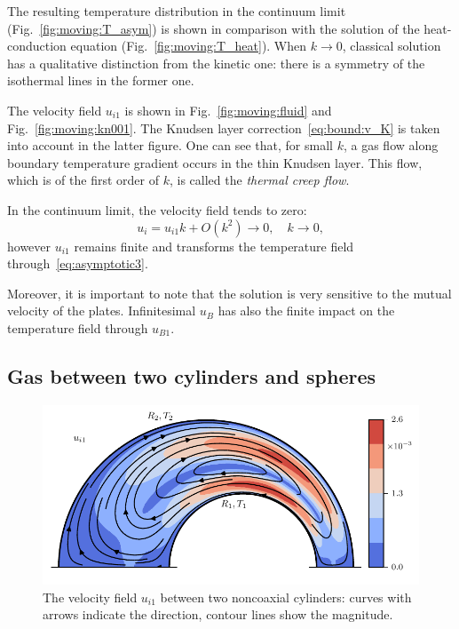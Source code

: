 \documentclass[smallextended, referee]{svjour3} %
\begin{document}
The resulting temperature distribution in the continuum limit (Fig.~\ref{fig:moving:T_asym}) is shown
in comparison with the solution of the heat-conduction equation (Fig.~\ref{fig:moving:T_heat}).
When \(k\to0\), classical solution has a qualitative distinction from the kinetic one: 
there is a symmetry of the isothermal lines in the former one.

The velocity field \(u_{i1}\) is shown in Fig.~\ref{fig:moving:fluid} and Fig.~\ref{fig:moving:kn001}.
The Knudsen layer correction~\eqref{eq:bound:v_K} is taken into account in the latter figure.
One can see that, for small \(k\), a gas flow along boundary temperature gradient occurs
in the thin Knudsen layer. This flow, which is of the first order of \(k\), is called
the \textit{thermal creep flow}.

In the continuum limit, the velocity field tends to zero:
\[ u_i = u_{i1}k + O(k^2) \to 0, \quad k\to0, \]
however \(u_{i1}\) remains finite and transforms the temperature field through~\eqref{eq:asymptotic3}.

Moreover, it is important to note that the solution is very sensitive to the mutual velocity of the plates.
Infinitesimal \(u_B\) has also the finite impact on the temperature field through \(u_{B1}\).

\subsection{Gas between two cylinders and spheres}

\begin{figure}
	\centering
	\includegraphics{Fig7}
	\caption{The velocity field \(u_{i1}\) between two noncoaxial cylinders:
		curves with arrows indicate the direction, contour lines show the magnitude.}
	\label{fig:cylinders}
\end{figure}
\end{document}
